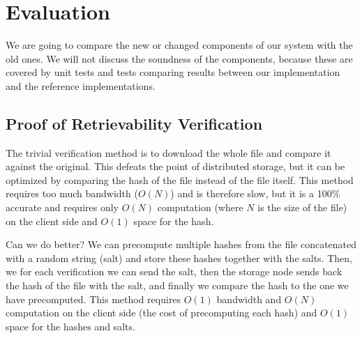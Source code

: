 \chapter{Evaluation}
\label{chap:evaluation}

We are going to compare the new or changed components of our system with the old ones.
We will not discuss the soundness of the components, because these are covered by unit tests and tests comparing results between our implementation and the reference implementations.

\section{Proof of Retrievability Verification}

The trivial verification method is to download the whole file and compare it against the original.
This defeats the point of distributed storage, but it can be optimized by comparing the hash of the file instead of the file itself.
This method requires too much bandwidth ($O(N)$) and is therefore slow,
but it is a 100\% accurate and requires only $O(N)$ computation (where $N$ is the size of the file) on the client side and $O(1)$ space for the hash.

Can we do better?
We can precompute multiple hashes from the file concatenated with a random string (salt) and store these hashes together with the salts.
Then, we for each verification we can send the salt, then the storage node sends back the hash of the file with the salt, and finally we compare the hash to the one we have precomputed.
This method requires $O(1)$ bandwidth and $O(N)$ computation on the client side (the cost of precomputing each hash) and $O(1)$ space for the hashes and salts.

